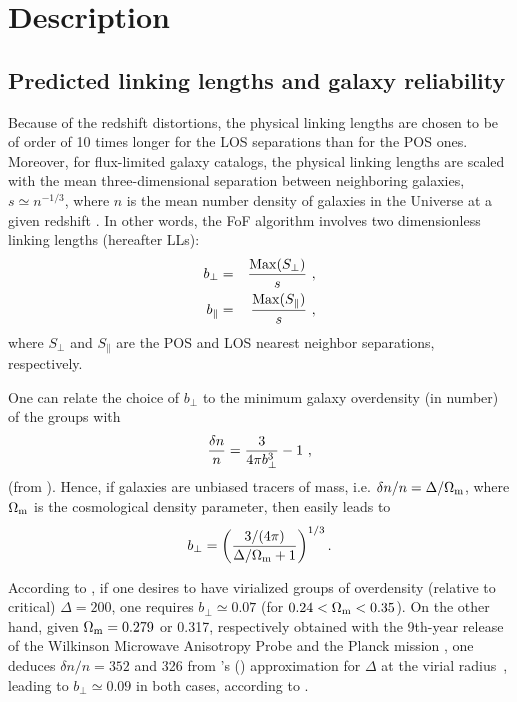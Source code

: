 \section{Description}
\label{sec:fof_description}

\subsection{Predicted linking lengths and galaxy reliability}
\label{sec:fofpred}

Because of the redshift distortions, the physical linking lengths are chosen to
be of order of 10 times longer for the LOS separations than for the POS ones.
Moreover, for flux-limited galaxy catalogs, the physical linking lengths are
scaled with the mean three-dimensional separation between neighboring galaxies,
$s \simeq n ^{-1/3}$, where $n$ is the mean number density of galaxies in the
Universe at a given redshift \citep{HG82}. In other words, the FoF algorithm
involves two dimensionless linking lengths (hereafter LLs):
%
\begin{eqnarray}
    b_\perp &=& {{\rm Max} (S_\perp)\over s} \ ,
\label{eq:bperpdef}
\\
    b_\parallel &=& {{\rm Max} (S_\parallel) \over s} \ ,
\label{eq:bpardef}
\end{eqnarray}
%
where $S_\perp$ and $S_\parallel$ are the POS
and LOS nearest neighbor separations, respectively.

One can relate the choice of $b_\perp$ to the minimum galaxy overdensity (in
number) of the groups with
%
\begin{equation}
    {\delta n\over n} = {3\over 4 \pi b_\perp^3} -1 \ ,
    \label{eq:dnovernfromb}
\end{equation}
%
(from \citealp{HG82}). Hence, if galaxies are unbiased tracers of mass, i.e.
$\delta n/n = \Delta/\Omega_{\rm m}$, where $\Omega_{\rm m}$ is the
cosmological density parameter, then  easily
leads to
%
\begin{equation}
    b_\perp = {\left ({3/(4\pi)\over \Delta/\Omega_{\rm m}+1}\right)}^{1/3}\,.
    \label{eq:bperpfromDelta}
\end{equation}

According to , if one desires to have
virialized groups of overdensity (relative to critical) $\Delta=200$, one
requires $b_\perp\simeq 0.07$ (for $0.24 < \Omega_{\rm m} < 0.35$). On the
other hand, given $\Omega_{\rm m}=0.279$ or 0.317, respectively obtained with
the 9th-year release of the Wilkinson Microwave Anisotropy Probe
\citep{Bennett+13} and the Planck mission \citep{PlanckXVI}, one deduces
$\delta n/n=352$ and 326 from \citeauthor{BN98}'s (\citeyear{BN98})
approximation for $\Delta$ at the virial radius~, leading to $b_\perp \simeq
0.09$ in both cases, according to .

